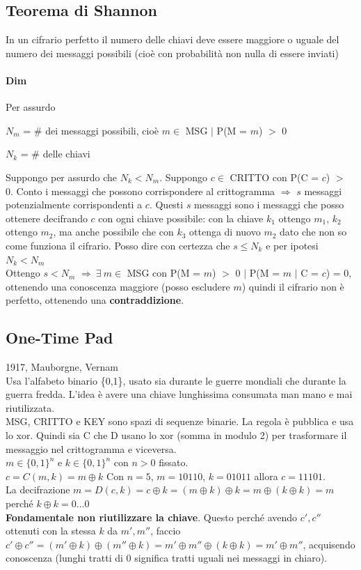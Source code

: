\documentclass[10pt]{book}
\begin{document}
\subsection{Teorema di Shannon} In un cifrario perfetto il numero delle chiavi deve essere maggiore o uguale del numero dei messaggi possibili (cioè con probabilità non nulla di essere inviati)
\paragraph{Dim} Per assurdo
\begin{list}{}{}
	\item $N_m$ = \# dei messaggi possibili, cioè $m\in$ MSG $|$ P(M = $m$) $>$ 0
	\item $N_k$ = \# delle chiavi
\end{list}
\pagebreak
Suppongo per assurdo che $N_k < N_m$. Suppongo $c\in$ CRITTO con P(C = $c$) $>$ 0. Conto i messaggi che possono corrispondere al crittogramma $\Rightarrow$ $s$ messaggi potenzialmente corrispondenti a $c$. Questi $s$ messaggi sono i messaggi che posso ottenere decifrando $c$ con ogni chiave possibile: con la chiave $k_1$ ottengo $m_1$, $k_2$ ottengo $m_2$, ma anche possibile che con $k_3$ ottenga di nuovo $m_2$ dato che non so come funziona il cifrario. Posso dire con certezza che $s \leq N_k$ e per ipotesi $N_k < N_m$\\
Ottengo $s < N_m$ $\Rightarrow\:\exists\:m\in$ MSG con P(M = $m$) $>$ 0 $|$ P(M = $m$ $|$ C = $c$) = 0, ottenendo una conoscenza maggiore (posso escludere $m$) quindi il cifrario non è perfetto, ottenendo una \textbf{contraddizione}.
\subsection{One-Time Pad}
1917, Mauborgne, Vernam\\
Usa l'alfabeto binario \{0,1\}, usato sia durante le guerre mondiali che durante la guerra fredda. L'idea è avere una chiave lunghissima consumata man mano e mai riutilizzata.\\
MSG, CRITTO e KEY sono spazi di sequenze binarie. La regola è pubblica e usa lo xor. Quindi sia C che D usano lo xor (somma in modulo 2) per trasformare il messaggio nel crittogramma e viceversa.\\
$m\in\{0,1\}^n$ e $k\in\{0,1\}^n$ con $n > 0$ fissato.\\
$c = C(m, k) = m \oplus k$
Con $n=5$, $m=10110$, $k=01011$ allora $c=11101$.\\La decifrazione $m = D(c,k) = c \oplus k = (m\oplus k)\oplus k = m \oplus (k \oplus k) = m$ perché $k \oplus k = 0\ldots 0$\\
\textbf{Fondamentale non riutilizzare la chiave}. Questo perché avendo $c', c''$ ottenuti con la stessa $k$ da $m',m''$, faccio $c'\oplus c'' = (m'\oplus k) \oplus (m''\oplus k) = m'\oplus m'' \oplus (k \oplus k) = m' \oplus m''$, acquisendo conoscenza (lunghi tratti di 0 significa tratti uguali nei messaggi in chiaro).
\end{document}
